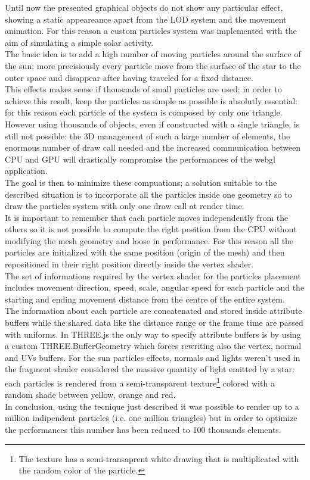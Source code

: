 \documentclass[paper=a4, fontsize=11pt]{scrartcl} %
\numberwithin{equation}{section} %
\numberwithin{figure}{section} %
\numberwithin{table}{section} %
\theoremstyle{definition}
\begin{document}
Until now the presented graphical objects do not show any particular effect, showing a static appeareance apart from the LOD system and the movement animation. For this reason a custom particles system was implemented with the aim of simulating a simple solar activity.\\
The basic idea is to add a high number of moving particles around the surface of the sun; more precisiously every particle move from the surface of the star to the outer space and disappear after having traveled for a fixed distance.\\
This effects makes sense if thousands of small particles are used; in order to achieve this result, keep the particles as simple as possible is absolutly essential: for this reason each particle of the system is composed by only one triangle.\\
However using thousands of objects, even if constructed with a single triangle, is still not possible: the 3D management of such a large number of elements, the enormous number of draw call needed and the increased communication between CPU and GPU will drastically compromise the performances of the webgl application.\\
The goal is then to minimize these compuations; a solution suitable to the described situation is to incorporate all the particles inside one geometry so to draw the particles system with only one draw call at render time.\\
It is important to remember that each particle moves independently from the others so it is not possible to compute the right position from the CPU without modifying the mesh geometry and loose in performance. For this reason all the particles are initialized with the same position (origin of the mesh) and then repositioned in their right position directly inside the vertex shader.\\
The set of informations required by the vertex shader for the particles placement includes movement direction, speed, scale, angular speed for each particle and the starting and ending movement distance from the centre of the entire system.\\
The information about each particle are concatenated and stored inside attribute buffers while the shared data like the distance range or the frame time are passed with uniforms. In THREE.js the only way to specify attribute buffers is by using a custom THREE.BufferGeometry which forces rewriting also the vertex, normal and UVs buffers. For the sun particles effects, normals and lights weren't used in the fragment shader considered the massive quantity of light emitted by a star: each particles is rendered from a semi-transparent texture\footnote{The texture has a semi-transaprent white drawing that is multiplicated with the random color of the particle.} colored with a random shade between yellow, orange and red.\\
In conclusion, using the tecnique just described it was possible to render up to a million indipendent particles (i.e. one million triangles) but in order to optimize the performances this number has been reduced to 100 thousands elements.
\end{document}
